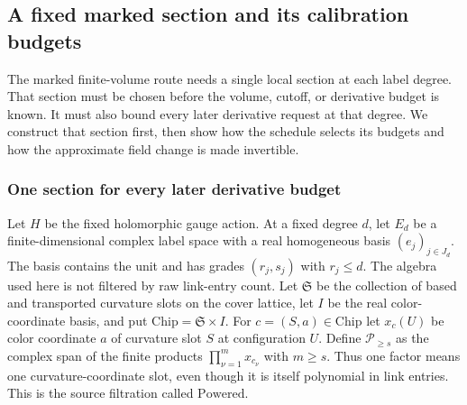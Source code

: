 \subsection{A fixed marked section and its calibration budgets}
\label{sec:ex-marked-portfolio-calibration}

The marked finite-volume route needs a single local section at each label
degree. That section must be chosen before the volume, cutoff, or derivative
budget is known. It must also bound every later derivative request at that
degree. We construct that section first, then show how the schedule selects
its budgets and how the approximate field change is made invertible.

\subsubsection{One section for every later derivative budget}

Let $H$ be the fixed holomorphic gauge action. At a fixed degree $d$, let
$E_d$ be a finite-dimensional complex label space with a real homogeneous
basis $(e_j)_{j\in J_d}$. The basis contains the unit and has grades
$(r_j,s_j)$ with $r_j\leq d$. The algebra used here is not filtered by raw
link-entry count. Let $\mathfrak S$ be the collection of based and
transported curvature slots on the cover lattice, let $I$ be the real
color-coordinate basis, and put $\mathrm{Chip}=\mathfrak S\times I$.
For $c=(S,a)\in\mathrm{Chip}$ let $x_c(U)$ be color coordinate $a$ of
curvature slot $S$ at configuration $U$. Define $\mathcal P_{\geq s}$ as
the complex span of the finite products $\prod_{\nu=1}^m x_{c_\nu}$ with
$m\geq s$. Thus one factor means one curvature-coordinate slot, even
though it is itself polynomial in link entries. This is the source
filtration called $\mathrm{Powered}$.

